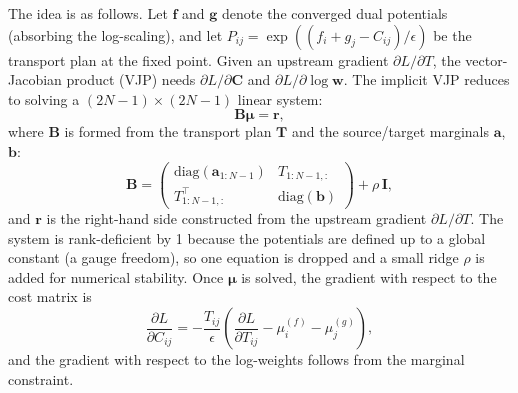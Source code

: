 \documentclass{article}
\begin{document}
The idea is as follows. Let $\mathbf{f}$ and $\mathbf{g}$ denote the converged dual potentials (absorbing the log-scaling), and let $P_{ij} = \exp((f_i + g_j - C_{ij})/\epsilon)$ be the transport plan at the fixed point. Given an upstream gradient $\partial L / \partial T$, the vector-Jacobian product (VJP) needs $\partial L / \partial \mathbf{C}$ and $\partial L / \partial \log\mathbf{w}$. The implicit VJP reduces to solving a $(2N-1) \times (2N-1)$ linear system:
\begin{equation}
    \mathbf{B}\boldsymbol{\mu} = \mathbf{r},
\end{equation}
where $\mathbf{B}$ is formed from the transport plan $\mathbf{T}$ and the source/target marginals $\mathbf{a}$, $\mathbf{b}$:
\begin{equation}
    \mathbf{B} = \begin{pmatrix} \mathrm{diag}(\mathbf{a}_{1:N-1}) & T_{1:N-1,:} \\ T_{1:N-1,:}^\top & \mathrm{diag}(\mathbf{b}) \end{pmatrix} + \rho\, \mathbf{I},
\end{equation}
and $\mathbf{r}$ is the right-hand side constructed from the upstream gradient $\partial L / \partial T$. The system is rank-deficient by 1 because the potentials are defined up to a global constant (a gauge freedom), so one equation is dropped and a small ridge $\rho$ is added for numerical stability. Once $\boldsymbol{\mu}$ is solved, the gradient with respect to the cost matrix is
\begin{equation}
    \frac{\partial L}{\partial C_{ij}} = -\frac{T_{ij}}{\epsilon}\left(\frac{\partial L}{\partial T_{ij}} - \mu_i^{(f)} - \mu_j^{(g)}\right),
\end{equation}
and the gradient with respect to the log-weights follows from the marginal constraint.
\end{document}
